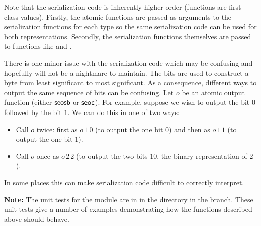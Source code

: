 Note that the serialization code is inherently higher-order (functions are first-class values).
Firstly, the atomic functions are passed as arguments to the serialization functions
for each type so the same serialization code can be used for both representations.
Secondly, the serialization functions themselves are passed to functions like 
and .

There is one minor issue with the serialization code which may be confusing
and hopefully will not be a nightmare to maintain.
The bits are used to construct a byte from least significant to most significant.
As a consequence, different ways to output the same sequence of bits can be confusing.
Let $o$ be an atomic output function (either $\func{seosb}$ or $\func{seoc}$).
For example, suppose we wish to output the bit $0$ followed by the bit $1$.
We can do this in one of two ways:
\begin{itemize}
\item Call $o$ twice: first as $o\,1\,0$ (to output the one bit $0$) and then as $o\,1\,1$ (to output the one bit $1$).
\item Call $o$ once as $o\,2\,2$ (to output the two bits $10$, the binary representation of $2$).
\end{itemize}
In some places this can make serialization code difficult to correctly interpret.

{\bf{Note:}} The unit tests for the {} module are in {}
in the {}
directory in the {} branch.
These unit tests give a number of examples demonstrating how the functions described above should behave.
